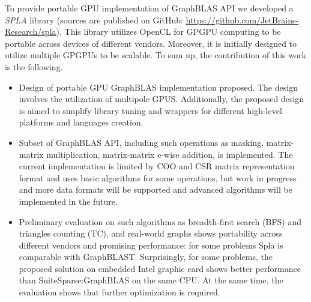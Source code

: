 To provide portable GPU implementation of GraphBLAS API we developed a \textit{SPLA} library (sources are published on GitHub: \url{https://github.com/JetBrains-Research/spla}).
This library utilizes OpenCL for GPGPU computing to be portable across devices of different vendors.
Moreover, it is initially designed to utilize multiple GPGPUs to be scalable.
To sum up, the contribution of this work is the following.
\begin{itemize}
    \item Design of portable GPU GraphBLAS implementation proposed. The design involves the utilization of multipole GPUS. Additionally, the proposed design is aimed to simplify library tuning and wrappers for different high-level platforms and languages creation. 
    \item Subset of GraphBLAS API, including such operations as masking, matrix-matrix multiplication, matrix-matrix e-wise addition, is implemented. The current implementation is limited by COO and CSR matrix representation format and uses basic algorithms for some operations, but work in progress and more data formats will be supported and advanced algorithms will be implemented in the future.
    \item Preliminary evaluation on such algorithms as breadth-first search (BFS) and triangles counting (TC), and real-world graphs shows portability across different vendors and promising performance: for some problems Spla is comparable with GraphBLAST. Surprisingly, for some problems, the proposed solution on embedded Intel graphic card shows better performance than SuiteSparse:GraphBLAS on the same CPU. At the same time, the evaluation shows that further optimization is required.
\end{itemize} 